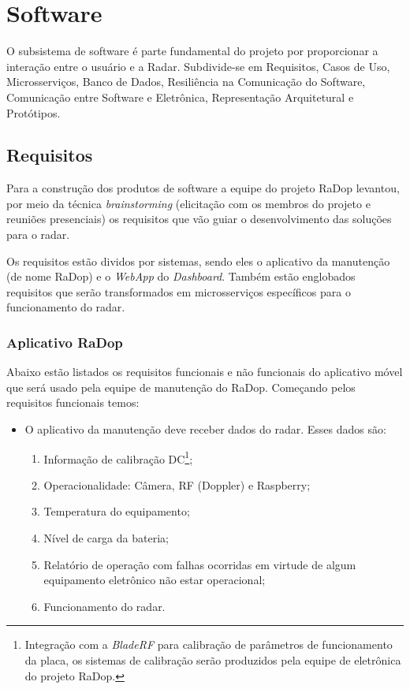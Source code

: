 \chapter{Software}

O subsistema de software é parte fundamental do projeto por proporcionar a interação entre o usuário e a Radar. Subdivide-se em Requisitos, Casos de Uso, Microsserviços, Banco de Dados, Resiliência na Comunicação do Software, Comunicação entre Software e Eletrônica, Representação Arquitetural e Protótipos.

\section{Requisitos}\nopagebreak

Para a construção dos produtos de software a equipe do projeto RaDop levantou, por meio da técnica \textit{brainstorming} (elicitação com os membros do projeto e reuniões presenciais) os requisitos que vão guiar o desenvolvimento das soluções para o radar.

Os requisitos estão dividos por sistemas, sendo eles o aplicativo da manutenção (de nome RaDop) e o \textit{WebApp} do \textit{Dashboard}. Também estão englobados requisitos que serão transformados em microsserviços específicos para o funcionamento do radar.

\subsection{Aplicativo RaDop}

Abaixo estão listados os requisitos funcionais e não funcionais do aplicativo móvel que será usado pela equipe de manutenção do RaDop. Começando pelos requisitos funcionais temos:


\begin{itemize}
  \item O aplicativo da manutenção deve receber dados do radar. Esses dados são:
  \begin{enumerate}
    \item Informação de calibração DC\footnote{Integração com a \textit{BladeRF} para calibração de parâmetros de funcionamento da placa, os sistemas de calibração serão produzidos pela equipe de eletrônica do projeto RaDop.};
    \item Operacionalidade: Câmera, RF (Doppler) e Raspberry;
    \item Temperatura do equipamento;
    \item Nível de carga da bateria;
    \item Relatório de operação com falhas ocorridas em virtude de algum equipamento eletrônico não estar operacional;
    \item Funcionamento do radar.
  \end{enumerate}
\end{itemize}

